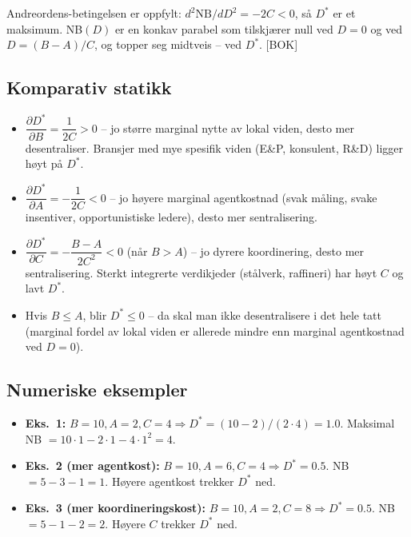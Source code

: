 Andreordens-betingelsen er oppfylt: $d^2\mathrm{NB}/dD^2 = -2C < 0$, så $D^*$ er et maksimum. NB$(D)$ er en konkav parabel som tilskjærer null ved $D=0$ og ved $D = (B-A)/C$, og topper seg midtveis -- ved $D^*$. [BOK]

\subsection*{Komparativ statikk}
\begin{itemize}\setlength{\itemsep}{2pt}
\item $\dfrac{\partial D^*}{\partial B} = \dfrac{1}{2C} > 0$ -- jo større marginal nytte av lokal viden, desto mer desentraliser. Bransjer med mye spesifik viden (E\&P, konsulent, R\&D) ligger høyt på $D^*$.
\item $\dfrac{\partial D^*}{\partial A} = -\dfrac{1}{2C} < 0$ -- jo høyere marginal agentkostnad (svak måling, svake insentiver, opportunistiske ledere), desto mer sentralisering.
\item $\dfrac{\partial D^*}{\partial C} = -\dfrac{B-A}{2C^2} < 0$ (når $B>A$) -- jo dyrere koordinering, desto mer sentralisering. Sterkt integrerte verdikjeder (stålverk, raffineri) har høyt $C$ og lavt $D^*$.
\item Hvis $B \le A$, blir $D^* \le 0$ -- da skal man ikke desentralisere i det hele tatt (marginal fordel av lokal viden er allerede mindre enn marginal agentkostnad ved $D=0$).
\end{itemize}

\subsection*{Numeriske eksempler}
\begin{itemize}\setlength{\itemsep}{2pt}
\item \textbf{Eks.\ 1:} $B=10, A=2, C=4 \Rightarrow D^* = (10-2)/(2\cdot 4) = 1.0$. Maksimal NB $= 10\cdot 1 - 2\cdot 1 - 4\cdot 1^2 = 4$.
\item \textbf{Eks.\ 2 (mer agentkost):} $B=10, A=6, C=4 \Rightarrow D^* = 0.5$. NB $= 5 - 3 - 1 = 1$. Høyere agentkost trekker $D^*$ ned.
\item \textbf{Eks.\ 3 (mer koordineringskost):} $B=10, A=2, C=8 \Rightarrow D^* = 0.5$. NB $= 5 - 1 - 2 = 2$. Høyere $C$ trekker $D^*$ ned.
\end{itemize}

